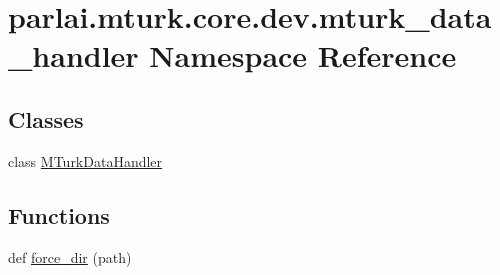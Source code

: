 \hypertarget{namespaceparlai_1_1mturk_1_1core_1_1dev_1_1mturk__data__handler}{}\section{parlai.\+mturk.\+core.\+dev.\+mturk\+\_\+data\+\_\+handler Namespace Reference}
\label{namespaceparlai_1_1mturk_1_1core_1_1dev_1_1mturk__data__handler}
\subsection*{Classes}
\begin{DoxyCompactItemize}
\item 
class \hyperlink{classparlai_1_1mturk_1_1core_1_1dev_1_1mturk__data__handler_1_1MTurkDataHandler}{M\+Turk\+Data\+Handler}
\end{DoxyCompactItemize}
\subsection*{Functions}
\begin{DoxyCompactItemize}
\item 
def \hyperlink{namespaceparlai_1_1mturk_1_1core_1_1dev_1_1mturk__data__handler_a91afc0627fc6e88d49e71f4471fb56b8}{force\+\_\+dir} (path)
\end{DoxyCompactItemize}
